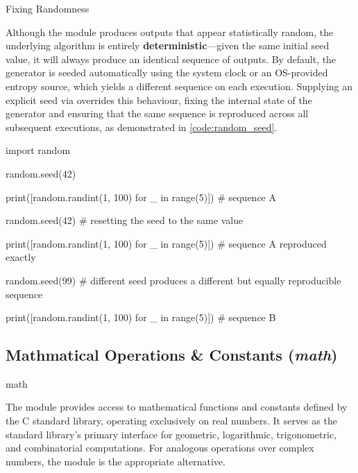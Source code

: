 \documentclass[10pt]{article}
\begin{document}
    \begin{core}{Fixing Randomness}

      Although the  module produces outputs that appear statistically random, the underlying algorithm is entirely \textbf{deterministic}---given the same initial seed value, it will always produce an identical sequence of outputs. By default, the generator is seeded automatically using the system clock or an OS-provided entropy source, which yields a different sequence on each execution. Supplying an explicit seed via  overrides this behaviour, fixing the internal state of the generator and ensuring that the same sequence is reproduced across all subsequent executions, as demonstrated in \autoref{code:random_seed}.

      \begin{pyconsole}

        import random

        random.seed(42)

        print([random.randint(1, 100) for _ in range(5)]) # sequence A

        random.seed(42) # resetting the seed to the same value

        print([random.randint(1, 100) for _ in range(5)]) # sequence A reproduced exactly

        random.seed(99) # different seed produces a different but equally reproducible sequence

        print([random.randint(1, 100) for _ in range(5)]) # sequence B

      \end{pyconsole}

    \end{core}

  \subsection{Mathmatical Operations \& Constants (\textit{math})}

    \begin{core}{math}

      The \href{https://docs.python.org/3/library/math.html}{} module provides access to mathematical functions and constants defined by the C standard library, operating exclusively on real numbers. It serves as the standard library's primary interface for geometric, logarithmic, trigonometric, and combinatorial computations. For analogous operations over complex numbers, the \href{https://docs.python.org/3/library/cmath.html#module-cmath}{} module is the appropriate alternative.

    \end{core}
\end{document}

